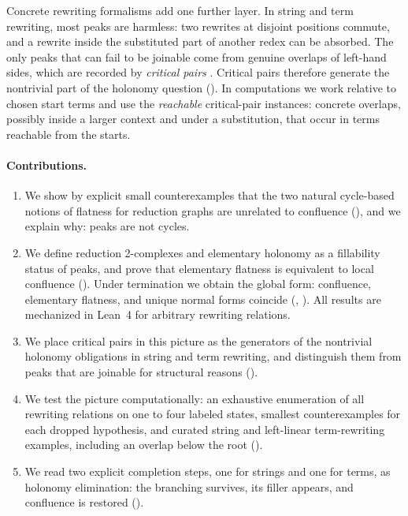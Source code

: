 Concrete rewriting formalisms add one further layer. In string and term rewriting, most peaks are harmless: two rewrites at disjoint positions commute, and a rewrite inside the substituted part of another redex can be absorbed. The only peaks that can fail to be joinable come from genuine overlaps of left-hand sides, which are recorded by \emph{critical pairs} \cite{KnuthBendix1970,Huet1980,BaaderNipkow1998}. Critical pairs therefore generate the nontrivial part of the holonomy question (). In computations we work relative to chosen start terms and use the \emph{reachable} critical-pair instances: concrete overlaps, possibly inside a larger context and under a substitution, that occur in terms reachable from the starts.

\paragraph{Contributions.}
\begin{enumerate}
    \item We show by explicit small counterexamples that the two natural cycle-based notions of flatness for reduction graphs are unrelated to confluence (), and we explain why: peaks are not cycles.
    \item We define reduction 2-complexes and elementary holonomy as a fillability status of peaks, and prove that elementary flatness is equivalent to local confluence (). Under termination we obtain the global form: confluence, elementary flatness, and unique normal forms coincide (, ). All results are mechanized in Lean~4 for arbitrary rewriting relations.
    \item We place critical pairs in this picture as the generators of the nontrivial holonomy obligations in string and term rewriting, and distinguish them from peaks that are joinable for structural reasons ().
    \item We test the picture computationally: an exhaustive enumeration of all rewriting relations on one to four labeled states, smallest counterexamples for each dropped hypothesis, and curated string and left-linear term-rewriting examples, including an overlap below the root ().
    \item We read two explicit completion steps, one for strings and one for terms, as holonomy elimination: the branching survives, its filler appears, and confluence is restored ().
\end{enumerate}


